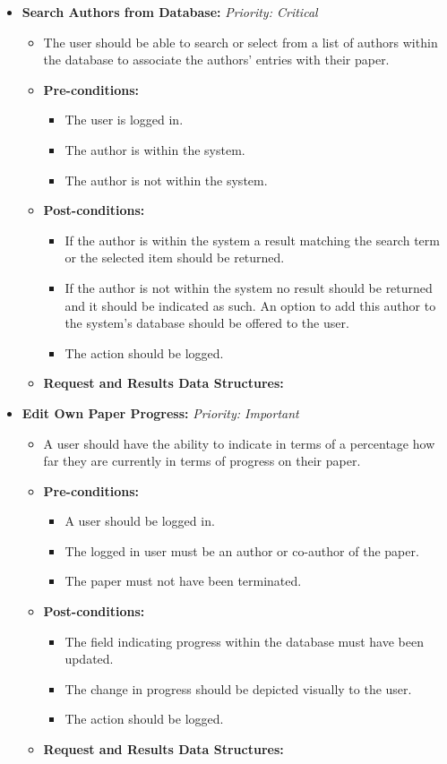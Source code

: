 \documentclass{article}
\begin{document}
\begin{itemize}
					\item \textbf{Search Authors from Database:} \hfill \textit{Priority: Critical}
					\begin{itemize}
						\item The user should be able to search or select from a list of authors within the database to associate the authors' entries with their paper.
						\item \textbf{Pre-conditions:}
						\begin{itemize}
							\item The user is logged in.
							\item The author is within the system.
							\item The author is not within the system.
						\end{itemize}
						\item \textbf{Post-conditions:}
						\begin{itemize}
							\item If the author is within the system a result matching the search term or the selected item should be returned.
							\item If the author is not within the system no result should be returned and it should be indicated as such. An option to add this author to the system's database should be offered to the user.
							\item The action should be logged.
						\end{itemize}
						\item \textbf{Request and Results Data Structures:}
					\end{itemize}
					
					\item \textbf{Edit Own Paper Progress:} \hfill \textit{Priority: Important}
					\begin{itemize}
						\item A user should have the ability to indicate in terms of a percentage how far they are currently in terms of progress on their paper.
						\item \textbf{Pre-conditions:}
						\begin{itemize}
							\item A user should be logged in.
							\item The logged in user must be an author or co-author of the paper.
							\item The paper must not have been terminated.
						\end{itemize}
						\item \textbf{Post-conditions:}
						\begin{itemize}
							\item The field indicating progress within the database must have been updated.
							\item The change in progress should be depicted visually to the user.
							\item The action should be logged.
						\end{itemize}
						\item \textbf{Request and Results Data Structures:}
					\end{itemize}
					

\end{itemize}
\end{document}
